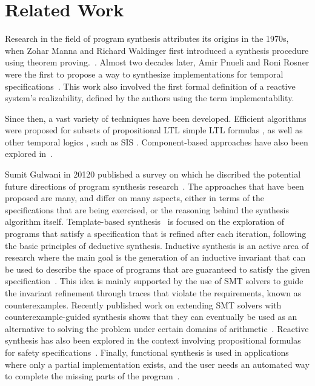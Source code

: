 \section{Related Work}

Research in the field of program synthesis attributes its origins in the 1970s,
when Zohar Manna and Richard Waldinger first introduced a synthesis procedure
using theorem proving.~\cite{manna1971toward}. Almost two decades later, Amir
Pnueli and Roni Rosner were the first to propose a way to synthesize
implementations for temporal specifications~\cite{Pnueli89}. This work also
involved the first formal definition of a reactive system's realizability,
defined by the authors using the term implementability.

Since then, a vast variety of techniques have been developed. Efficient
algorithms were proposed for subsets of propositional LTL
\cite{Klein10,tomita2016safraless,ehlers2010symbolic,cheng2016structural} simple
LTL formulas \cite{Bohy12,hagihara2016simple,Tini03}, as well as other temporal
logics \cite{benevs2012factorization,monmege2016real,Hamza10}, such as SIS \cite{Aziz95}.
Component-based approaches have also been explored in~\cite{Chatterjee07,dammyou}.

Sumit Gulwani in 20120 published a survey on which he discribed the
potential future directions of program synthesis research~\cite{gulwani2010dimensions}.
The approaches that have been proposed are many, and differ on many aspects,
either in terms of the specifications that are being exercised, or the reasoning
behind the synthesis algorithm itself. Template-based
synthesis~\cite{srivastava2013template} is focused on the exploration of
programs that satisfy a specification that is refined after each
iteration, following the basic principles of deductive synthesis. Inductive
synthesis is an active area of research where the main goal
is the generation of an inductive invariant that can be used to describe the
space of programs that are guaranteed to satisfy the given
specification~\cite{flener2001inductive}.
This idea is mainly supported by the use of SMT solvers to guide the invariant
refinement through traces that violate the requirements, known as
counterexamples. Recently published work on extending SMT solvers with
counterexample-guided synthesis shows that they can eventually be
used as an alternative to solving the problem under certain domains of
arithmetic~\cite{reynoldscounterexample}. Reactive synthesis has also
been explored in the context involving propositional formulas for safety
specifications~\cite{bloem2016satisfiability}. Finally, functional synthesis is
used in applications where only a partial implementation exists, and the user needs an automated way to complete the missing parts of the program~\cite{kneuss2013integrating}.


